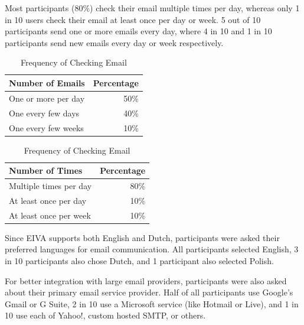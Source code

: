 \documentclass{article}
\begin{document}
Most participants (80\%) check their email multiple times per day, whereas only 1 in 10 users check their email at least once per day or week. 5 out of 10 participants send one or more emails every day, where 4 in 10 and 1 in 10 participants send new emails every day or week respectively.

\begin{table}[!htb]
    \begin{minipage}{.5\linewidth}
   	 \caption{Frequency of Emails Sent}
      \centering
        \begin{tabular}{lr}
	        \hline
            \textbf{Number of Emails} & \textbf{Percentage} \\
            \hline
            One or more per day & 50\% \\
            One every few days & 40\% \\
            One every few weeks & 10\% \\
            \hline
        \end{tabular}
    \end{minipage}%
    \hspace{.1cm}
    \begin{minipage}{.5\linewidth}
      \centering
	    \caption{Frequency of Checking Email}
        \begin{tabular}{lr}
	        \hline
            \textbf{Number of Times} & \textbf{Percentage} \\
            \hline
            Multiple times per day & 80\% \\
            At least once per day & 10\% \\
            At least once per week & 10\% \\
            \hline
        \end{tabular}
    \end{minipage} 
\end{table}

Since EIVA supports both English and Dutch, participants were asked their preferred languages for email communication. All participants selected English, 3 in 10 participants also chose Dutch, and 1 participant also selected Polish.

For better integration with large email providers, participants were also asked about their primary email service provider. Half of all participants use Google's Gmail or G Suite, 2 in 10 use a Microsoft service (like Hotmail or Live), and 1 in 10 use each of Yahoo!, custom hosted SMTP, or others.
\end{document}
